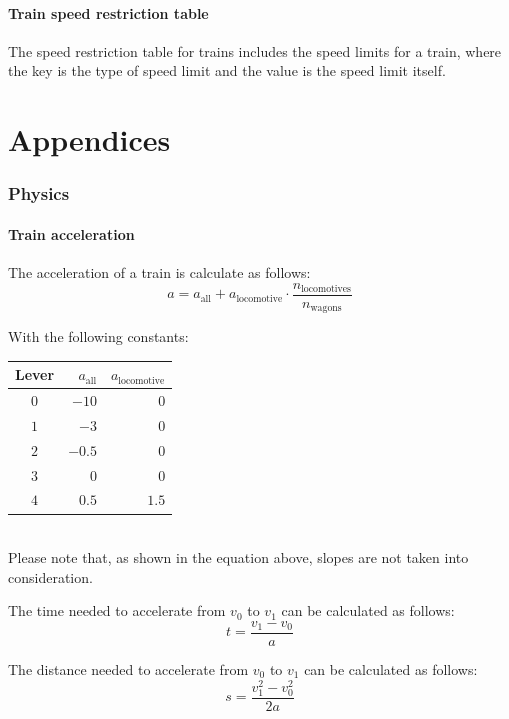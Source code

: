 \documentclass[notitlepage]{article}
\begin{document}
\subsection{Train speed restriction table}
The speed restriction table for trains includes the speed limits for a train, where the key is the type of speed limit and the value is the speed limit itself.

\appendix
\newpage
\part*{Appendices}

\section{Physics}\label{s:physics}

\subsection{Train acceleration}

The acceleration of a train is calculate as follows:
\[a = a_{\text{all}} + a_{\text{locomotive}}\cdot\frac{n_{\text{locomotives}}}{n_{\text{wagons}}}\]

With the following constants:

\begin{tabular}{|c|r|r|}
  \hline
  Lever & $a_{\text{all}}$ & $a_{\text{locomotive}}$ \\
  \hline
  $0$ & $-10$ & $0$ \\
  $1$ & $-3$ & $0$ \\
  $2$ & $-0.5$ & $0$ \\
  $3$ & $0$ & $0$ \\
  $4$ & $0.5$ & $1.5$ \\
  \hline
\end{tabular}\\

Please note that, as shown in the equation above, slopes are not taken into consideration.

The time needed to accelerate from $v_0$ to $v_1$ can be calculated as follows:
\[ t = \frac{v_1-v_0}{a} \]

The distance needed to accelerate from $v_0$ to $v_1$ can be calculated as follows:
\[ s = \frac{v_1^2 - v_0^2}{2a} \]

\ifx\HCode\undefined
\printindex
\fi
\end{document}
